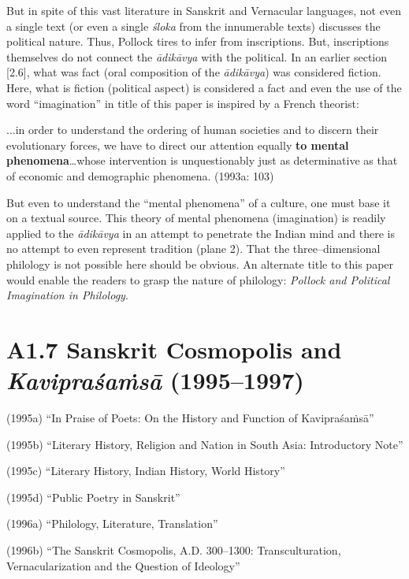 But in spite of this vast literature in Sanskrit and Vernacular languages, not even a single text (or even a single \textit{śloka} from the innumerable texts) discusses the political nature. Thus, Pollock tires to infer from inscriptions. But, inscriptions themselves do not connect the \textit{ādikāvya} with the political. In an earlier section [2.6], what was fact (oral composition of the\textit{ ādikāvya}) was considered fiction. Here, what is fiction (political aspect) is considered a fact and even the use of the word “imagination” in title of this paper is inspired by a French theorist:

\begin{myquote}
...in order to understand the ordering of human societies and to discern their evolutionary forces, we have to direct our attention equally \textbf{to mental phenomena}…whose intervention is unquestionably just as determinative as that of economic and demographic phenomena. (1993a: 103)
\end{myquote}

But even to understand the “mental phenomena” of a culture, one must base it on a textual source. This theory of mental phenomena (imagination) is readily applied to the \textit{ādikāvya} in an attempt to penetrate the Indian mind and there is no attempt to even represent tradition (plane 2). That the three–dimensional philology is not possible here should be obvious. An alternate title to this paper would enable the readers to grasp the nature of philology: \textit{Pollock and Political Imagination in Philology}.

\vspace{-.3cm}

\section*{A1.7 Sanskrit Cosmopolis and \textit{Kavipraśaṁsā} (1995–1997)}

(1995a) “In Praise of Poets: On the History and Function of Kavipraśaṁsā”

(1995b) “Literary History, Religion and Nation in South Asia: Introductory Note”

(1995c) “Literary History, Indian History, World History”

(1995d) “Public Poetry in Sanskrit”

(1996a) “Philology, Literature, Translation”

(1996b) “The Sanskrit Cosmopolis, A.D. 300–1300: Transculturation, Vernacularization and the Question of Ideology”

